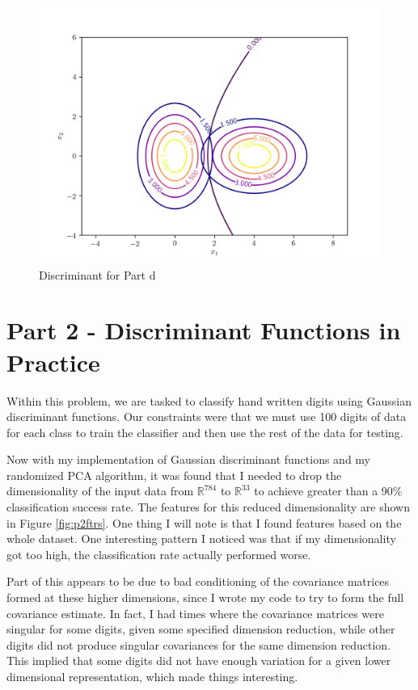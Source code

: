 \documentclass{article}[12pt]
\begin{document}
\begin{figure}[ht]
	\centerline{
		\includegraphics[scale=0.7]{../scripts/p1/discriminant_d.png}}
	\caption{Discriminant for Part d}
	\label{fig:dpd}
\end{figure}

\newpage
   \section{Part 2 - Discriminant Functions in Practice}
   Within this problem, we are tasked to classify hand written digits using Gaussian discriminant functions. Our constraints were that we must use 100 digits of data for each class to train the classifier and then use the rest of the data for testing.

   Now with my implementation of Gaussian discriminant functions and my randomized PCA algorithm, it was found that I needed to drop the dimensionality of the input data from $\mathbb{R}^{784}$ to $\mathbb{R}^{33}$ to achieve greater than a 90\% classification success rate. The features for this reduced dimensionality are shown in Figure \ref{fig:p2ftrs}. One thing I will note is that I found features based on the whole dataset. One interesting pattern I noticed was that if my dimensionality got too high, the classification rate actually performed worse. 
   
   Part of this appears to be due to bad conditioning of the covariance matrices formed at these higher dimensions, since I wrote my code to try to form the full covariance estimate. In fact, I had times where the covariance matrices were singular for some digits, given some specified dimension reduction, while other digits did not produce singular covariances for the same dimension reduction. This implied that some digits did not have enough variation for a given lower dimensional representation, which made things interesting.
\end{document}
